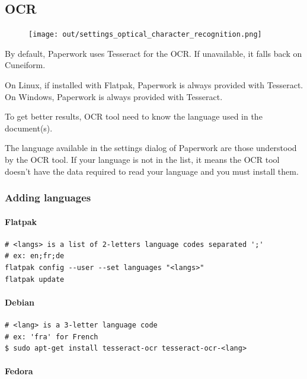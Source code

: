 \documentclass[10pt,a4paper]{article}
\begin{document}
\subsection{OCR}

\begin{figure}[H]
	\texttt{[image: out/settings\_optical\_character\_recognition.png]}
\end{figure}

By default, Paperwork uses Tesseract for the OCR. If unavailable,
it falls back on Cuneiform.

On Linux, if installed with Flatpak, Paperwork is always provided with
Tesseract. On Windows, Paperwork is always provided with Tesseract.

To get better results, OCR tool need to know the language used in
the document(s).

The language available in the settings dialog of Paperwork are those
understood by the OCR tool. If your language is not in the list, it
means the OCR tool doesn't have the data required to read your language
and you must install them.


\subsubsection{Adding languages}

\paragraph{Flatpak}

\begin{verbatim}
# <langs> is a list of 2-letters language codes separated ';'
# ex: en;fr;de
flatpak config --user --set languages "<langs>"
flatpak update
\end{verbatim}


\paragraph{Debian}

\begin{verbatim}
# <lang> is a 3-letter language code
# ex: 'fra' for French
$ sudo apt-get install tesseract-ocr tesseract-ocr-<lang>
\end{verbatim}

\paragraph{Fedora}
\end{document}
